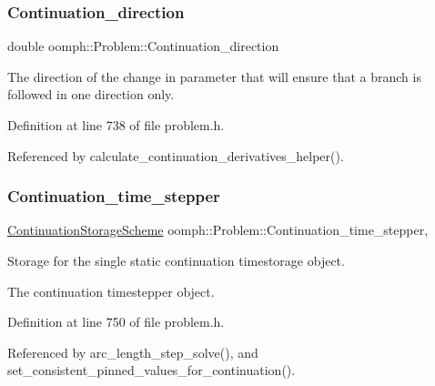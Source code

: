 \subsubsection{\texorpdfstring{Continuation\+\_\+direction}{Continuation\_direction}}
{\footnotesize\ttfamily double oomph\+::\+Problem\+::\+Continuation\+\_\+direction\hspace{0.3cm}{\ttfamily [protected]}}



The direction of the change in parameter that will ensure that a branch is followed in one direction only. 



Definition at line 738 of file problem.\+h.



Referenced by calculate\+\_\+continuation\+\_\+derivatives\+\_\+helper().

\mbox{\label{classoomph_1_1Problem_ade29c0a82218d50136b4b3860055ad30}} 
\subsubsection{\texorpdfstring{Continuation\+\_\+time\+\_\+stepper}{Continuation\_time\_stepper}}
{\footnotesize\ttfamily \hyperlink{classoomph_1_1ContinuationStorageScheme}{Continuation\+Storage\+Scheme} oomph\+::\+Problem\+::\+Continuation\+\_\+time\+\_\+stepper\hspace{0.3cm}{\ttfamily [static]}, {\ttfamily [protected]}}



Storage for the single static continuation timestorage object. 

The continuation timestepper object. 

Definition at line 750 of file problem.\+h.



Referenced by arc\+\_\+length\+\_\+step\+\_\+solve(), and set\+\_\+consistent\+\_\+pinned\+\_\+values\+\_\+for\+\_\+continuation().

\mbox{\label{classoomph_1_1Problem_aa2e04de221f29c13067e2fe4cf4c70f9}} 
